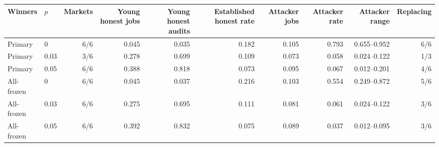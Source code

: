 \begin{tabular}{llrrrrrrrr}
\toprule
Winners & $p$ & Markets & Young honest jobs & Young honest audits & Established honest rate & Attacker jobs & Attacker rate & Attacker range & Replacing \\
\midrule
Primary & 0 & 6/6 & 0.045 & 0.035 & 0.182 & 0.105 & 0.793 & 0.655--0.952 & 6/6 \\
Primary & 0.03 & 3/6 & 0.278 & 0.699 & 0.109 & 0.073 & 0.058 & 0.024--0.122 & 1/3 \\
Primary & 0.05 & 6/6 & 0.388 & 0.818 & 0.073 & 0.095 & 0.067 & 0.012--0.201 & 4/6 \\
All-frozen & 0 & 6/6 & 0.045 & 0.037 & 0.216 & 0.103 & 0.554 & 0.249--0.872 & 5/6 \\
All-frozen & 0.03 & 6/6 & 0.275 & 0.695 & 0.111 & 0.081 & 0.061 & 0.024--0.122 & 3/6 \\
All-frozen & 0.05 & 6/6 & 0.392 & 0.832 & 0.075 & 0.089 & 0.037 & 0.012--0.095 & 3/6 \\
\bottomrule
\end{tabular}
